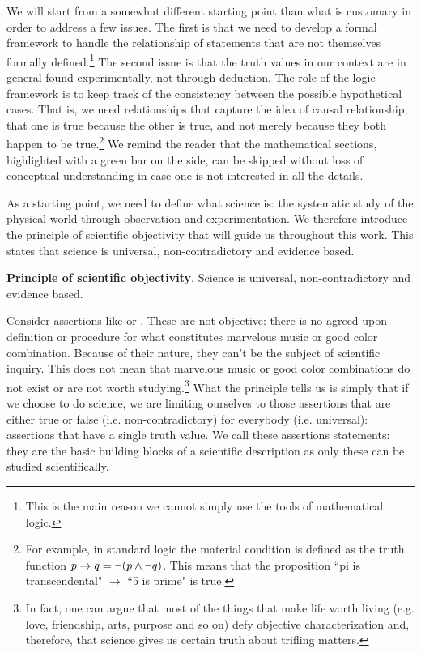 \documentclass[11pt,letterpaper,fleqn]{memoir} %
\begin{document}
We will start from a somewhat different starting point than what is customary in order to address a few issues. The first is that we need to develop a formal framework to handle the relationship of statements that are not themselves formally defined.\footnote{This is the main reason we cannot simply use the tools of mathematical logic.} The second issue is that the truth values in our context are in general found experimentally, not through deduction. The role of the logic framework is to keep track of the consistency between the possible hypothetical cases. That is, we need relationships that capture the idea of causal relationship, that one is true because the other is true, and not merely because they both happen to be true.\footnote{For example, in standard logic the material condition is defined as the truth function $p \to q = \neg( p \wedge \neg q)$. This means that the proposition ``pi is transcendental" $\to$ ``5 is prime" is true.} We remind the reader that the mathematical sections, highlighted with a green bar on the side, can be skipped without loss of conceptual understanding in case one is not interested in all the details. 

As a starting point, we need to define what science is: the systematic study of the physical world through observation and experimentation. We therefore introduce the principle of scientific objectivity that will guide us throughout this work. This states that science is universal, non-contradictory and evidence based.

\begin{mathSection}
	\textbf{Principle of scientific objectivity}.
		Science is universal, non-contradictory and evidence based.
\end{mathSection}

Consider assertions like  or . These are not objective: there is no agreed upon definition or procedure for what constitutes marvelous music or good color combination. Because of their nature, they can't be the subject of scientific inquiry. This does not mean that marvelous music or good color combinations do not exist or are not worth studying.\footnote{In fact, one can argue that most of the things that make life worth living (e.g. love, friendship, arts, purpose and so on) defy objective characterization and, therefore, that science gives us certain truth about trifling matters.} What the principle tells us is simply that if we choose to do science, we are limiting ourselves to those assertions that are either true or false (i.e. non-contradictory) for everybody (i.e. universal): assertions that have a single truth value. We call these assertions statements: they are the basic building blocks of a scientific description as only these can be studied scientifically.
\end{document}
